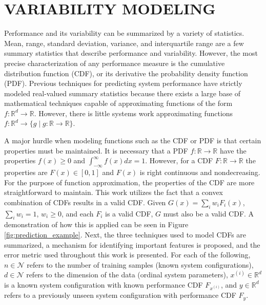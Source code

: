 \documentclass[letterpaper, 10 pt, conference]{ieeeconf}  %
\begin{document}
\section{VARIABILITY MODELING}
\label{sec:variability_modeling}

Performance and its variability can be summarized by a variety of statistics. Mean, range, standard deviation, variance, and interquartile range are a few summary statistics that describe performance and variability. However, the most precise characterization of any performance measure is the cumulative distribution function (CDF), or its derivative the probability density function (PDF). Previous techniques for predicting system performance have strictly modeled real-valued summary statistics because there exists a large base of mathematical techniques capable of approximating functions of the form $f: \mathbb{R}^d \rightarrow \mathbb{R}$. However, there is little systems work approximating functions $f: \mathbb{R}^d \rightarrow \{g \mid g: \mathbb{R} \rightarrow \mathbb{R}\}$.

A major hurdle when modeling functions such as the CDF or PDF is that certain properties must be maintained. It is necessary that a PDF $f: \mathbb{R} \rightarrow \mathbb{R}$ have the properties $f(x) \geq 0$ and $\int_{-\infty}^{\infty}f(x)dx = 1$. However, for a CDF $F: \mathbb{R} \rightarrow \mathbb{R}$ the properties are $F(x) \in [0,1]$ and $F(x)$ is right continuous and nondecreasing. For the purpose of function approximation, the properties of the CDF are more straightforward to maintain. This work utilizes the fact that a convex combination of CDFs results in a valid CDF. Given $G(x) = \sum_{i}w_i F_i(x)$, $\sum_{i} w_i = 1$, $w_i \geq 0$, and each $F_i$ is a valid CDF, $G$ must also be a valid CDF. A demonstration of how this is applied can be seen in Figure \ref{fig:prediction_example}. Next, the three techniques used to model CDFs are summarized, a mechanism for identifying important features is proposed, and the error metric used throughout this work is presented. For each of the following, $n \in \mathcal{N}$ refers to the number of training samples (known system configurations), $d \in \mathcal{N}$ refers to the dimension of the data (ordinal system parameters), $x^{(i)} \in \mathbb{R}^d$ is a known system configuration with known performance CDF $F_{x^{(i)}}$, and $y \in \mathbb{R}^d$ refers to a previously unseen system configuration with performance CDF $F_y$.
\end{document}
